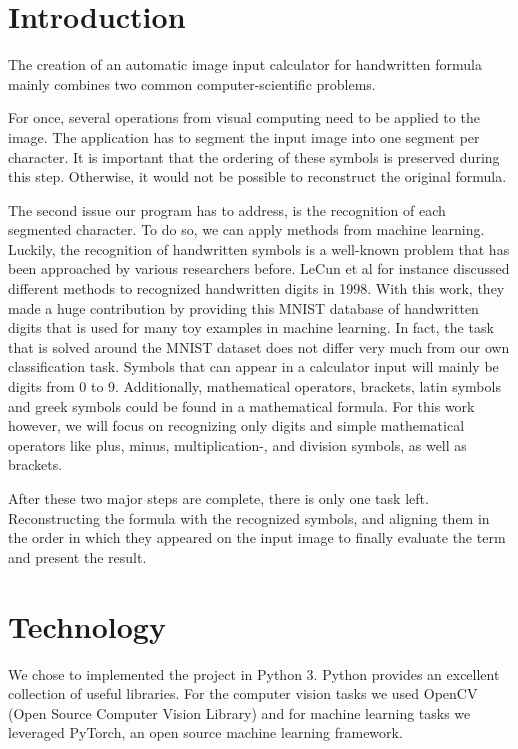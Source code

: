 \documentclass[12pt]{article}
\begin{document}
\section{Introduction}
The creation of an automatic image input calculator for handwritten formula mainly combines two common computer-scientific problems. 

For once, several operations from visual computing need to be applied to the image. The application has to segment the input image into one segment per character. It is important that the ordering of these symbols is preserved during this step. Otherwise, it would not be possible to reconstruct the original formula.

The second issue our program has to address, is the recognition of each segmented character. To do so, we can apply methods from machine learning. Luckily, the recognition of handwritten symbols is a well-known problem that has been approached by various researchers before. LeCun et al \cite{lecun1998} for instance discussed different methods to recognized handwritten digits in 1998. With this work, they made a huge contribution by providing this MNIST database of handwritten digits \cite{mnist} that is used for many toy examples in machine learning. In fact, the task that is solved around the MNIST dataset does not differ very much from our own classification task. Symbols that can appear in a calculator input will mainly be digits from 0 to 9. Additionally, mathematical operators, brackets, latin symbols and greek symbols could be found in a mathematical formula. For this work however, we will focus on recognizing only digits and simple mathematical operators like plus, minus, multiplication-, and division symbols, as well as brackets.

After these two major steps are complete, there is only one task left. Reconstructing the formula with the recognized symbols, and aligning them in the order in which they appeared on the input image to finally evaluate the term and present the result.

\section{Technology}
We chose to implemented the project in Python 3. Python provides an excellent collection of useful libraries. For the computer vision tasks we used OpenCV (Open Source Computer Vision Library) and for machine learning tasks we leveraged PyTorch, an open source machine learning framework.
\end{document}
